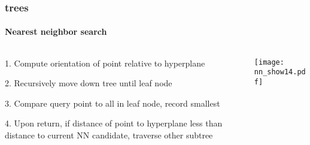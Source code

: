 \begin{frame}[noframenumbering]
  \frametitle{\kd trees}
  \framesubtitle{Nearest neighbor search}
  \begin{columns}[T]
    \begin{column}{.5\textwidth}
      \begin{block}{}%
        {\color{white} 1.\hspace{1mm} Compute orientation of point relative to hyperplane
          \\\vspace{0.4cm}
        
        2.\hspace{1mm} Recursively move down tree until leaf node\\\vspace{0.4cm}

        {\color{graph-red}
        3.\hspace{1mm} Compare query point to all in leaf node, record smallest}\\\vspace{0.4cm}
    
        4.\hspace{1mm} Upon return, if distance of point to hyperplane less than distance to current
          NN candidate, traverse other subtree}
      \end{block}
    \end{column}
    \begin{column}{.5\textwidth}
      \begin{block}{}
        \texttt{[image: nn\_show14.pdf]}
      \end{block}
    \end{column}
  \end{columns}
\end{frame}
